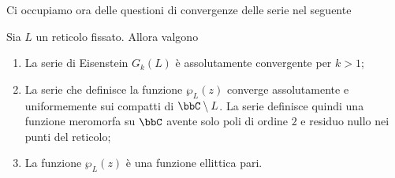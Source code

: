 Ci occupiamo ora delle questioni di convergenze delle serie nel seguente
\begin{teorema}
    Sia $L$ un reticolo fissato. Allora valgono
    \begin{enumerate}
        \item La serie di Eisenstein $G_k(L)$ è assolutamente convergente per $k>1$;
        \item La serie che definisce la funzione $\wp_L(z)$ converge assolutamente e uniformemente sui compatti di $\bbC\setminus L$. La serie definisce quindi una funzione meromorfa su $\bbC$ avente solo poli di ordine $2$ e residuo nullo nei punti del reticolo;
        \item La funzione $\wp_L(z)$ è una funzione ellittica pari.
    \end{enumerate}
\end{teorema}
